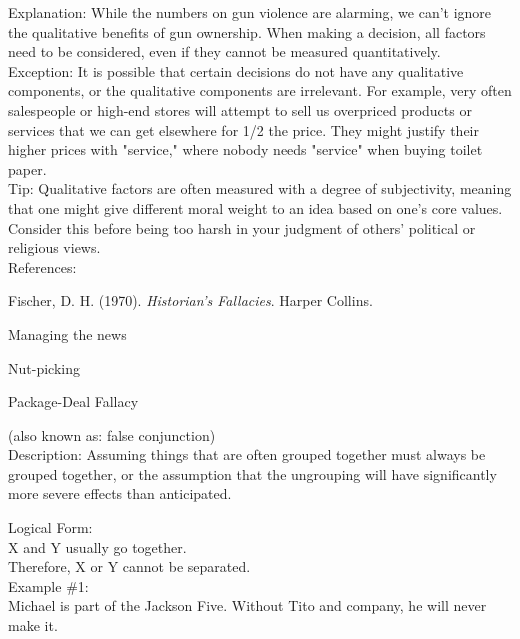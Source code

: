 \documentclass[a4paper,12pt,single,pdftex]{scrartcl}
\begin{document}
{    
      Explanation: While the numbers on gun violence are alarming, we can't ignore the qualitative benefits of gun ownership. When making a decision, all factors need to be considered, even if they cannot be measured quantitatively.
    \\

    
      Exception: It is possible that certain decisions do not have any qualitative components, or the qualitative components are irrelevant. For example, very often salespeople or high-end stores will attempt to sell us overpriced products or services that we can get elsewhere for 1/2 the price. They might justify their higher prices with "service," where nobody needs "service" when buying toilet paper.
    \\

    
      Tip: Qualitative factors are often measured with a degree of subjectivity, meaning that one might give different moral weight to an idea based on one's core values. Consider this before being too harsh in your judgment of others' political or religious views.
    \\

    References:

    
      
        Fischer, D. H. (1970). {\it Historian’s Fallacies}. Harper Collins.
      
    
  }


Managing the news

Nut-picking

Package-Deal Fallacy
    
      (also known as: false conjunction)
    \\

  
    Description: Assuming things that are often grouped together must always be grouped together, or the assumption that the ungrouping will have significantly more severe effects than anticipated.

    
      Logical Form:
    \\

    
      X and Y usually go together.
    \\

    
      Therefore, X or Y cannot be separated.
    \\

    
      Example \#1:
    \\

    
      Michael is part of the Jackson Five.  Without Tito and company, he will never make it.
    \\
\end{document}
